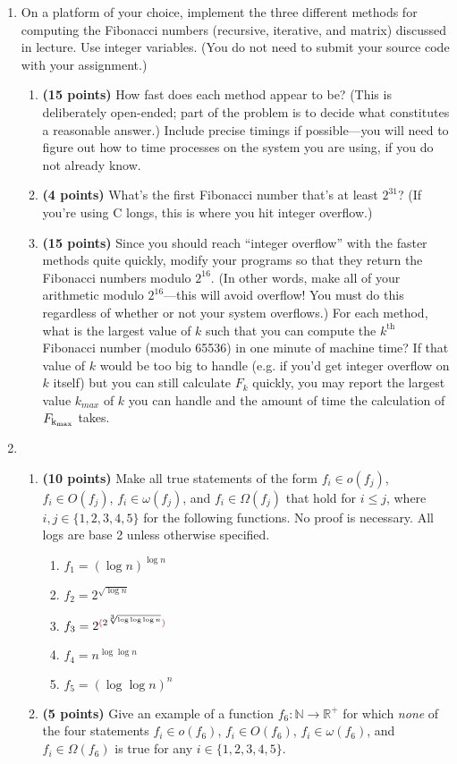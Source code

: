 \documentclass[11pt]{article}
\begin{document}
\begin{enumerate}[leftmargin=*]
\item
On a platform of your choice, implement the three different methods for computing the Fibonacci
numbers (recursive, iterative, and matrix) discussed in lecture. Use integer variables. (You do not need to submit your source code with your assignment.)
\begin{enumerate}
\item
{\bf (15 points)}
How fast does
each method appear to be? (This is deliberately open-ended; part of the problem is to decide what constitutes a reasonable answer.)
Include precise timings if possible---you will need to figure out how to time processes on the system
you are using, if you do not already know.
\item
{\bf (4 points)}
What's the first Fibonacci number that's at least $2^{31}$? (If you're using C longs, this is where you hit
integer overflow.)
\item
{\bf (15 points)}
Since you should reach ``integer overflow'' with the faster methods quite quickly, modify your programs
so that they return the Fibonacci numbers modulo $2^{16}$. (In other words, make all of your
arithmetic modulo $2^{16}$---this will avoid overflow! You must do this regardless of whether or not your
system overflows.) For each method, what is the largest value of $k$ such that you can compute the
$k^\text{th}$ Fibonacci number (modulo 65536) in one minute of machine time? If that value of $k$ would be too big to handle (e.g. if you'd get integer overflow on $k$ itself) but you can still calculate $F_{k}$ quickly, you may report the largest value $k_{max}$ of $k$ you can handle and the amount of time the calculation of $F_{\rm k_{max}}$ takes. 
\end{enumerate}


\item
\begin{enumerate}
\item
{\bf (10 points)}
Make all true statements of the form $f_i \in o(f_j)$, $f_i \in O(f_j)$, $f_i \in \omega(f_j)$, and $f_i \in \Omega(f_j)$ that hold for $i \le j$, where $i, j \in \{1,2,3,4,5\}$ for the following functions. No proof is necessary. All logs are base 2 unless otherwise specified.
\begin{enumerate}
\item $f_1 = (\log n)^{\log n}$
\item $f_2 = 2^{\sqrt{\log n}}$
\item $f_3 = 2^{{\color{red}(}2^{\sqrt[3]{\log\log\log n}}{\color{red})}}$
\item $f_4 = n^{\log\log n}$
\item $f_5 = (\log\log n)^n$
\end{enumerate}
\item
{\bf (5 points)}
Give an example of a function $f_6: \mathbb{N} \to \mathbb{R}^+$ for which \emph{none} of the four statements $f_i \in o(f_6)$, $f_i \in O(f_6)$, $f_i \in \omega(f_6)$, and $f_i \in \Omega(f_6)$ is true for any $i \in \{1,2,3,4,5\}$.
\end{enumerate}


\end{enumerate}
\end{document}

